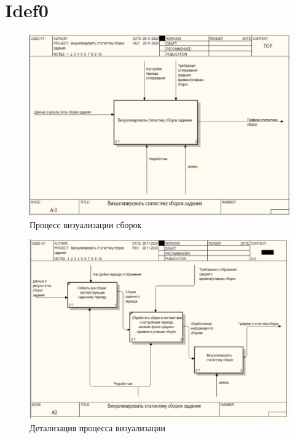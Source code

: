 \chapter{Idef0}\label{appendix-extra-examples}
\begin{figure}[ht!] 
	\center
	\includegraphics [scale=0.7] {my_folder/images//ide1}
	\caption{Процесс визуализации сборок} 
	\label{fig:spbpu_hydrotower-app-}  
\end{figure}

\begin{figure}[ht!] 
	\center
	\includegraphics [scale=0.7] {my_folder/images//ide2}
	\caption{Детализация процесса визуализации} 
	\label{fig:spbpu_hydrotower-app-}  
\end{figure}

